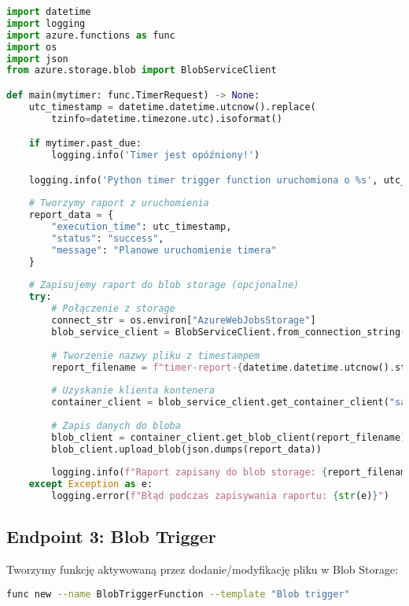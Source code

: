 \documentclass{article}
\begin{document}
\begin{lstlisting}[language=Python]
import datetime
import logging
import azure.functions as func
import os
import json
from azure.storage.blob import BlobServiceClient

def main(mytimer: func.TimerRequest) -> None:
    utc_timestamp = datetime.datetime.utcnow().replace(
        tzinfo=datetime.timezone.utc).isoformat()

    if mytimer.past_due:
        logging.info('Timer jest opóźniony!')

    logging.info('Python timer trigger function uruchomiona o %s', utc_timestamp)
    
    # Tworzymy raport z uruchomienia
    report_data = {
        "execution_time": utc_timestamp,
        "status": "success",
        "message": "Planowe uruchomienie timera"
    }
    
    # Zapisujemy raport do blob storage (opcjonalne)
    try:
        # Połączenie z storage
        connect_str = os.environ["AzureWebJobsStorage"]
        blob_service_client = BlobServiceClient.from_connection_string(connect_str)
        
        # Tworzenie nazwy pliku z timestampem
        report_filename = f"timer-report-{datetime.datetime.utcnow().strftime('%Y%m%d-%H%M%S')}.json"
        
        # Uzyskanie klienta kontenera
        container_client = blob_service_client.get_container_client("samples-workitems")
        
        # Zapis danych do bloba
        blob_client = container_client.get_blob_client(report_filename)
        blob_client.upload_blob(json.dumps(report_data))
        
        logging.info(f"Raport zapisany do blob storage: {report_filename}")
    except Exception as e:
        logging.error(f"Błąd podczas zapisywania raportu: {str(e)}")
\end{lstlisting}

\subsection{Endpoint 3: Blob Trigger}

Tworzymy funkcję aktywowaną przez dodanie/modyfikację pliku w Blob Storage:

\begin{lstlisting}[language=bash]
func new --name BlobTriggerFunction --template "Blob trigger"
\end{lstlisting}
\end{document}
